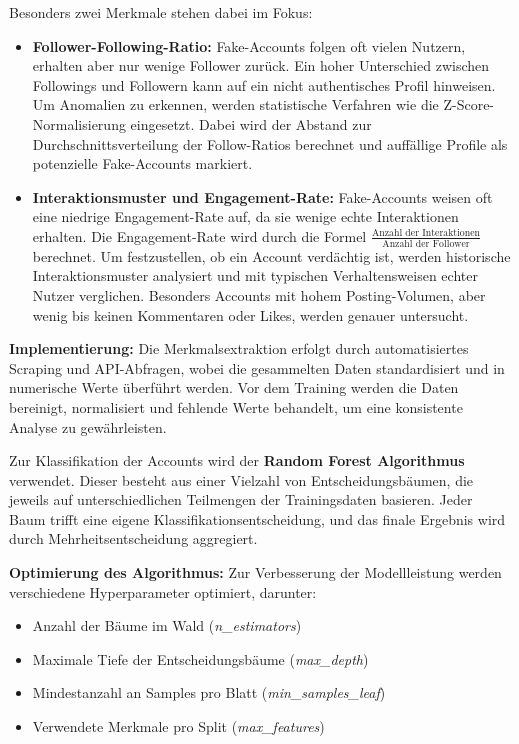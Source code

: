 \documentclass[12pt]{report}
\begin{document}
Besonders zwei Merkmale stehen dabei im Fokus:

\begin{itemize}[noitemsep, leftmargin=*, labelsep=1em]
	\item \textbf{Follower-Following-Ratio:} Fake-Accounts folgen oft vielen Nutzern, erhalten aber nur wenige Follower zurück. Ein hoher Unterschied zwischen Followings und Followern kann auf ein nicht authentisches Profil hinweisen. Um Anomalien zu erkennen, werden statistische Verfahren wie die Z-Score-Normalisierung eingesetzt. Dabei wird der Abstand zur Durchschnittsverteilung der Follow-Ratios berechnet und auffällige Profile als potenzielle Fake-Accounts markiert.
	
	
	\item \textbf{Interaktionsmuster und Engagement-Rate:} Fake-Accounts weisen oft eine niedrige Engagement-Rate auf, da sie wenige echte Interaktionen erhalten. Die Engagement-Rate wird durch die Formel \(\frac{\text{Anzahl der Interaktionen}}{\text{Anzahl der Follower}}\) berechnet. Um festzustellen, ob ein Account verdächtig ist, werden historische Interaktionsmuster analysiert und mit typischen Verhaltensweisen echter Nutzer verglichen. Besonders Accounts mit hohem Posting-Volumen, aber wenig bis keinen Kommentaren oder Likes, werden genauer untersucht.
\end{itemize}

\textbf{Implementierung:} Die Merkmalsextraktion erfolgt durch automatisiertes Scraping und API-Abfragen, wobei die gesammelten Daten standardisiert und in numerische Werte überführt werden. Vor dem Training werden die Daten bereinigt, normalisiert und fehlende Werte behandelt, um eine konsistente Analyse zu gewährleisten. 

Zur Klassifikation der Accounts wird der \textbf{Random Forest Algorithmus} verwendet. Dieser besteht aus einer Vielzahl von Entscheidungsbäumen, die jeweils auf unterschiedlichen Teilmengen der Trainingsdaten basieren. Jeder Baum trifft eine eigene Klassifikationsentscheidung, und das finale Ergebnis wird durch Mehrheitsentscheidung aggregiert.

\textbf{Optimierung des Algorithmus:} Zur Verbesserung der Modellleistung werden verschiedene Hyperparameter optimiert, darunter:

\begin{itemize}[noitemsep, leftmargin=*, labelsep=1em]
	\item Anzahl der Bäume im Wald (\textit{n\_estimators})
	\item Maximale Tiefe der Entscheidungsbäume (\textit{max\_depth})
	\item Mindestanzahl an Samples pro Blatt (\textit{min\_samples\_leaf})
	\item Verwendete Merkmale pro Split (\textit{max\_features})
\end{itemize}
\end{document}
